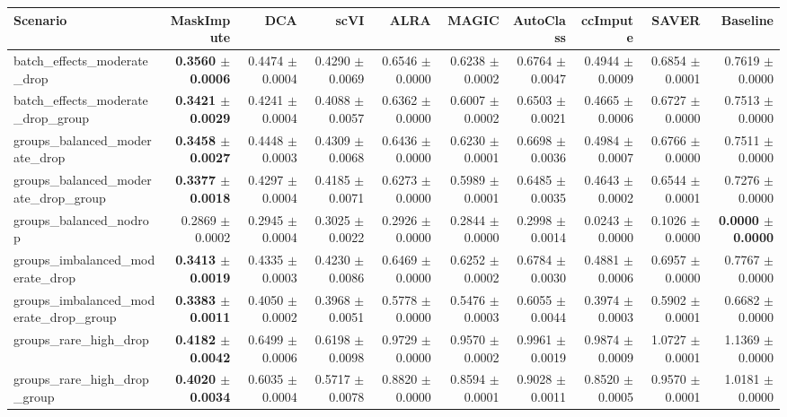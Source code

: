\begin{tabular}{@{}lrrrrrrrrr@{}}
\toprule
Scenario & MaskImpute & DCA & scVI & ALRA & MAGIC & AutoClass & ccImpute & SAVER & Baseline \\
\midrule
batch\_effects\_moderate\_drop & \textbf{0.3560 $\pm$ 0.0006} & 0.4474 $\pm$ 0.0004 & 0.4290 $\pm$ 0.0069 & 0.6546 $\pm$ 0.0000 & 0.6238 $\pm$ 0.0002 & 0.6764 $\pm$ 0.0047 & 0.4944 $\pm$ 0.0009 & 0.6854 $\pm$ 0.0001 & 0.7619 $\pm$ 0.0000 \\
batch\_effects\_moderate\_drop\_group & \textbf{0.3421 $\pm$ 0.0029} & 0.4241 $\pm$ 0.0004 & 0.4088 $\pm$ 0.0057 & 0.6362 $\pm$ 0.0000 & 0.6007 $\pm$ 0.0002 & 0.6503 $\pm$ 0.0021 & 0.4665 $\pm$ 0.0006 & 0.6727 $\pm$ 0.0000 & 0.7513 $\pm$ 0.0000 \\
groups\_balanced\_moderate\_drop & \textbf{0.3458 $\pm$ 0.0027} & 0.4448 $\pm$ 0.0003 & 0.4309 $\pm$ 0.0068 & 0.6436 $\pm$ 0.0000 & 0.6230 $\pm$ 0.0001 & 0.6698 $\pm$ 0.0036 & 0.4984 $\pm$ 0.0007 & 0.6766 $\pm$ 0.0000 & 0.7511 $\pm$ 0.0000 \\
groups\_balanced\_moderate\_drop\_group & \textbf{0.3377 $\pm$ 0.0018} & 0.4297 $\pm$ 0.0004 & 0.4185 $\pm$ 0.0071 & 0.6273 $\pm$ 0.0000 & 0.5989 $\pm$ 0.0001 & 0.6485 $\pm$ 0.0035 & 0.4643 $\pm$ 0.0002 & 0.6544 $\pm$ 0.0001 & 0.7276 $\pm$ 0.0000 \\
groups\_balanced\_nodrop & 0.2869 $\pm$ 0.0002 & 0.2945 $\pm$ 0.0004 & 0.3025 $\pm$ 0.0022 & 0.2926 $\pm$ 0.0000 & 0.2844 $\pm$ 0.0000 & 0.2998 $\pm$ 0.0014 & 0.0243 $\pm$ 0.0000 & 0.1026 $\pm$ 0.0000 & \textbf{0.0000 $\pm$ 0.0000} \\
groups\_imbalanced\_moderate\_drop & \textbf{0.3413 $\pm$ 0.0019} & 0.4335 $\pm$ 0.0003 & 0.4230 $\pm$ 0.0086 & 0.6469 $\pm$ 0.0000 & 0.6252 $\pm$ 0.0002 & 0.6784 $\pm$ 0.0030 & 0.4881 $\pm$ 0.0006 & 0.6957 $\pm$ 0.0000 & 0.7767 $\pm$ 0.0000 \\
groups\_imbalanced\_moderate\_drop\_group & \textbf{0.3383 $\pm$ 0.0011} & 0.4050 $\pm$ 0.0002 & 0.3968 $\pm$ 0.0051 & 0.5778 $\pm$ 0.0000 & 0.5476 $\pm$ 0.0003 & 0.6055 $\pm$ 0.0044 & 0.3974 $\pm$ 0.0003 & 0.5902 $\pm$ 0.0001 & 0.6682 $\pm$ 0.0000 \\
groups\_rare\_high\_drop & \textbf{0.4182 $\pm$ 0.0042} & 0.6499 $\pm$ 0.0006 & 0.6198 $\pm$ 0.0098 & 0.9729 $\pm$ 0.0000 & 0.9570 $\pm$ 0.0002 & 0.9961 $\pm$ 0.0019 & 0.9874 $\pm$ 0.0009 & 1.0727 $\pm$ 0.0001 & 1.1369 $\pm$ 0.0000 \\
groups\_rare\_high\_drop\_group & \textbf{0.4020 $\pm$ 0.0034} & 0.6035 $\pm$ 0.0004 & 0.5717 $\pm$ 0.0078 & 0.8820 $\pm$ 0.0000 & 0.8594 $\pm$ 0.0001 & 0.9028 $\pm$ 0.0011 & 0.8520 $\pm$ 0.0005 & 0.9570 $\pm$ 0.0001 & 1.0181 $\pm$ 0.0000 \\

\end{tabular}
